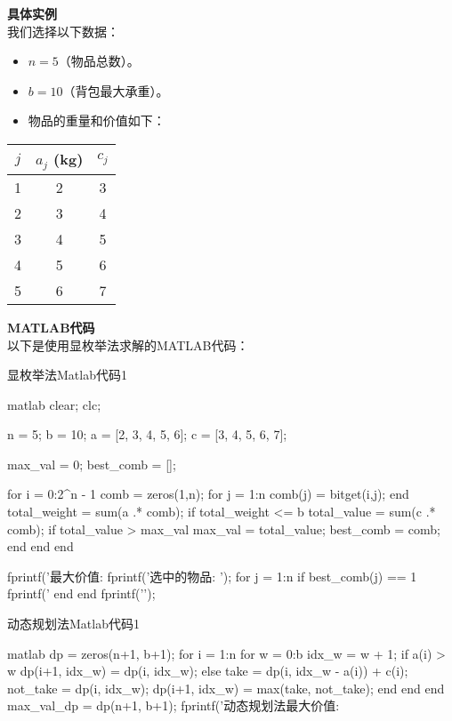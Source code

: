 \textbf{具体实例}\\
我们选择以下数据：
\begin{itemize}
    \item \( n = 5 \)（物品总数）。
    \item \( b = 10 \)（背包最大承重）。
    \item 物品的重量和价值如下：
\end{itemize}

\begin{center}
\begin{tabular}{|c|c|c|}
\hline
\( j \) & \( a_j \) (kg) & \( c_j \) \\
\hline
1 & 2 & 3 \\
2 & 3 & 4 \\
3 & 4 & 5 \\
4 & 5 & 6 \\
5 & 6 & 7 \\
\hline
\end{tabular}
\end{center}

\textbf{MATLAB代码}\\
以下是使用显枚举法求解的MATLAB代码：

\begin{codebox}{显枚举法Matlab代码}{1}
\begin{amzcode}{matlab}
clear; clc;

n = 5; %
b = 10; %
a = [2, 3, 4, 5, 6]; %
c = [3, 4, 5, 6, 7]; %

max_val = 0; %
best_comb = []; %

for i = 0:2^n - 1
    comb = zeros(1,n); %
    for j = 1:n
        comb(j) = bitget(i,j); %
    end
    total_weight = sum(a .* comb); %
    if total_weight <= b %
        total_value = sum(c .* comb); %
        if total_value > max_val %
            max_val = total_value;
            best_comb = comb;
        end
    end
end

fprintf('最大价值: %
fprintf('选中的物品: ');
for j = 1:n
    if best_comb(j) == 1
        fprintf('%
    end
end
fprintf('\n');
\end{amzcode}
\end{codebox}

\begin{codebox}{动态规划法Matlab代码}{1}
	\begin{amzcode}{matlab}
dp = zeros(n+1, b+1); %
for i = 1:n
    for w = 0:b
        idx_w = w + 1; %
        if a(i) > w
            dp(i+1, idx_w) = dp(i, idx_w); %
        else
            take = dp(i, idx_w - a(i)) + c(i); %
            not_take = dp(i, idx_w); %
            dp(i+1, idx_w) = max(take, not_take); %
        end
    end
end
max_val_dp = dp(n+1, b+1); %
fprintf('动态规划法最大价值: %
\end{amzcode}
\end{codebox}

